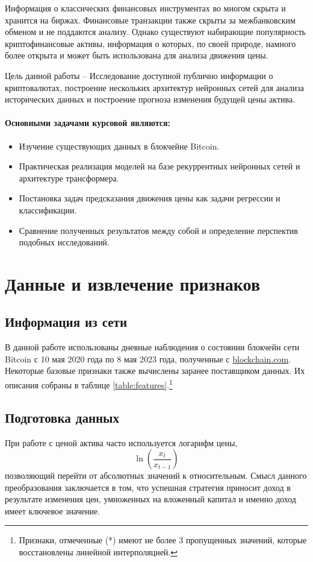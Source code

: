 \documentclass[diploma]{nanolab2015}
\begin{document}
Информация о классических финансовых инструментах во многом скрыта и хранится на биржах. Финансовые транзакции также скрыты за межбанковским обменом и не поддаются анализу. Однако существуют набирающие популярность криптофинансовые активы, информация о которых, по своей природе, намного более открыта и может быть использована для анализа движения цены.

Цель данной работы -- Исследование доступной публично информации о криптовалютах, построение нескольких архитектур нейронных сетей для анализа исторических данных и построение прогноза изменения будущей цены актива.


\paragraph*{Основными задачами курсовой являются:}
\begin{itemize}
    \item Изучение существующих данных в блокчейне Bitcoin.
    \item Практическая реализация моделей на базе рекуррентных нейронных сетей и архитектуре трансформера.
    \item Постановка задач предсказания движения цены как задачи регрессии и классификации.
    \item Сравнение полученных результатов между собой и определение перспектив подобных исследований.
\end{itemize}

\newpage
\section{Данные и извлечение признаков}
\subsection{Информация из сети}
В данной работе использованы дневные наблюдения о состоянии блокчейн сети Bitcoin с 10 мая 2020 года по 8 мая 2023 года, полученные с \href{https://www.blockchain.com/explorer/charts}{blockchain.com}. Некоторые базовые признаки также вычислены заранее поставщиком данных. Их описания собраны в таблице \ref{table:features}.\footnote{Признаки, отмеченные (*) имеют не более 3 пропущенных значений, которые восстановлены линейной интерполяцией.}

\subsection{Подготовка данных}
При работе с ценой актива часто используется логарифм цены,
$$
    \ln(\frac{x_{t}}{x_{t-1}})
$$
позволяющий перейти от абсолютных значений к относительным. Смысл данного преобразования заключается в том, что успешная стратегия приносит доход в результате изменения цен, умноженных на вложенный капитал и именно доход имеет ключевое значение.
\end{document}
